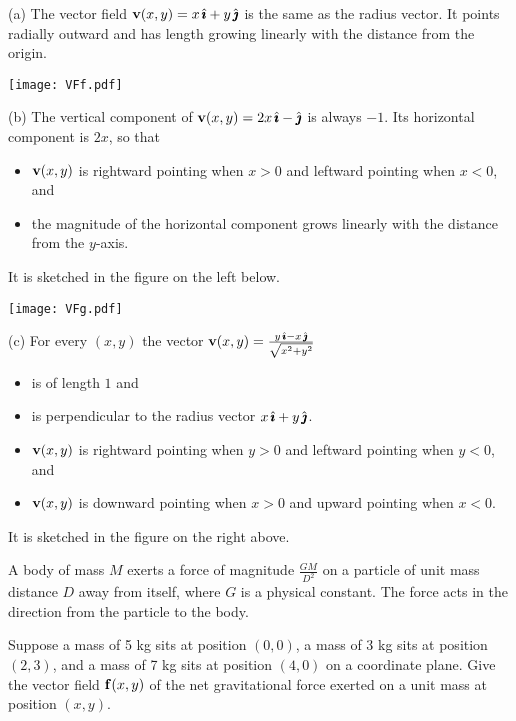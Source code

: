 \begin{solution}
(a) 
The vector field $\mathbf{v}(x,y) = x\,\hat{\pmb{\imath}}+y\,\hat{\pmb{\jmath}}$ is the same as the radius
vector. It points radially outward and has length growing linearly with
the distance from the origin.
\begin{center}
      \texttt{[image: VFf.pdf]}
\end{center}

(b) The vertical component of  $\mathbf{v}(x,y) = 2x\,\hat{\pmb{\imath}} -\hat{\pmb{\jmath}}$
is always $-1$. Its horizontal component is $2x$, so that
\begin{itemize}\itemsep1pt \parskip0pt  %
\item
$\mathbf{v}(x,y)$ is rightward pointing when $x>0$
     and leftward pointing when $x<0$, and
\item
  the magnitude of the horizontal component grows
linearly with the distance from the $y$-axis. 
\end{itemize}
It is sketched in the figure on the left below.
\begin{center}
      \texttt{[image: VFg.pdf]}\qquad
\end{center}

(c) For every $(x,y)$ the vector 
               $\mathbf{v}(x,y) = \frac{y\,\hat{\pmb{\imath}} -x\,\hat{\pmb{\jmath}}}{\sqrt{x^2+y^2}}$
\begin{itemize}\itemsep1pt \parskip0pt  %
\item
   is of length $1$ and
\item
   is perpendicular to the radius vector $x\,\hat{\pmb{\imath}}+y\,\hat{\pmb{\jmath}}$.
\item
   $\mathbf{v}(x,y)$ is rightward pointing when $y>0$
   and leftward pointing when $y<0$, and
\item
   $\mathbf{v}(x,y)$ is downward pointing when $x>0$
and upward pointing when $x<0$.
\end{itemize}
It is sketched in the figure on the right above.
\end{solution}


\begin{question}
A body of mass $M$ exerts a force of magnitude $\frac{GM}{D^2}$ on a particle  of unit mass distance $D$ away from itself, where $G$ is a physical constant. The force acts in the direction from the particle to the body.
\begin{center}
\end{center}

Suppose a mass of 5 kg sits at position $(0,0)$, a mass of 3 kg sits at position $(2,3)$, and a mass of 7 kg sits at position $(4,0)$ on a coordinate plane. Give the vector field $\mathbf{f}(x,y)$ of the net gravitational force exerted on a unit mass at position $(x,y)$. 
\end{question}

